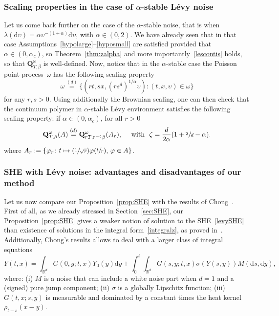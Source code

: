 \documentclass[11pt]{article}
\newcommand{\Subsubsection}{\subsubsection}
\numberwithin{equation}{section}
\let\sep:
\newcommand{\Psfrac}[2]{(\sfrac{#1}{#2})}
\theoremstyle{definition}
\newcommand{\dd}{\mathrm{d}}
\newcommand{\bQ}{{\ensuremath{\mathbf Q}} }
\newcommand{\bbR}{{\ensuremath{\mathbb R}} }
\let\ga\alpha
\let\gb\beta
\let\ups\upsilon
\let\go\omega
\begin{document}
\subsubsection{Scaling properties in the case of $\ga$-stable Lévy noise}
Let us come back further on the case
of the $\alpha$-stable noise,
that is when $\lambda(\dd \ups) = \ga \ups^{-(1+\ga)} \dd \ups$, with $\ga\in (0,2)$.
We have already seen that in that case Assumptions~\eqref{hypolarge}--\eqref{hyposmall} are satisfied provided that $\ga\in (0,\ga_c)$, so Theorem~\ref{thm:zalpha} and more importantly~\eqref{lescontis} holds, so that $\bQ_{T,\gb}^{\go}$ is well-defined.
Now, notice that in the $\ga$-stable case the Poisson point process~$\go$ has the following scaling property\vspace*{-3pt}
\[
\go \stackrel{(d)}{=} \{ (r t, s x, (rs^d)^{1/\ga} \ups) \sep (t,x,\ups)\in \go \}
\]
for any $r,s>0$.
Using additionally the Brownian scaling,
one can then check that
the continuum polymer in $\alpha$-stable Lévy environment
satisfies the following
scaling property: if $\ga\in (0,\ga_c)$, for all $r>0$
\begin{equation}\label{scaling}
\bQ^{\go }_{T, \beta} (A) \stackrel{(d)}{=} \bQ_{r T, r^{-\zeta}\gb }^{\go} (A_r), \quad \text{ with }\ \zeta=\frac{d}{2\ga} (1 +\sfrac{2}{d} - \ga).
\end{equation}
where $A_r := \{ \varphi_r\colon t\mapsto \Psfrac{1}{\sqrt{r}} \varphi(\sfrac{t}{r}),\, \varphi\in A \}$.

\Subsubsection{SHE with Lévy noise: advantages and disadvantages of our method}
Let us now compare our Proposition~\ref{prop:SHE}
with the results of Chong~\cite{Chong17}.
First of all, as we already stressed in Section~\ref{sec:SHE},
our Proposition~\ref{prop:SHE} gives a weaker
notion of solution to the SHE~\eqref{levySHE}
than existence of solutions in the integral form~\eqref{integralz}, as proved in~\cite{Chong17}.
Additionally,
Chong's results allows to deal with a larger class of integral equations
\begin{equation}
\label{SHEchong}
Y(t,x) = \int_{\bbR^d} G(0,y; t,x)Y_0(y)\dd y + \int_0^t \int_{\bbR^d} G(s,y ; t,x) \sigma(Y(s,y)) M(\dd s,\dd y),
\end{equation}
where: (i) $M$ is a noise that can include a white noise part when $d=1$ and a (signed) pure jump component;
(ii) $\sigma$ is a globally Lipschitz function;
(iii) $G(t,x; s,y)$ is measurable and dominated by a constant times the heat kernel $\rho_{t-s}(x-y)$.
\end{document}
